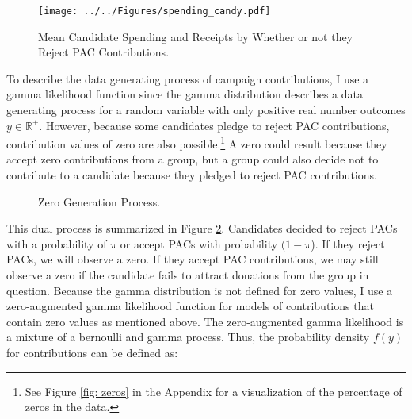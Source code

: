 \documentclass[12pt]{article}
\begin{document}
\begin{figure}[ht]
    \centering
    \texttt{[image: ../../Figures/spending\_candy.pdf]}
    \caption{Mean Candidate Spending and Receipts by Whether or not they Reject PAC Contributions.}
    \label{fig: spending}
\end{figure}

To describe the data generating process of campaign contributions, I use a gamma likelihood function since the gamma distribution describes a data generating process for a random variable with only positive real number outcomes $y \in  \mathbb{R}^+$. However, because some candidates pledge to reject PAC contributions, contribution values of zero are also possible.\footnote{See Figure \ref{fig: zeros} in the Appendix for a visualization of the percentage of zeros in the data.} A zero could result because they accept zero contributions from a group, but a group could also decide not to contribute to a candidate because they pledged to reject PAC contributions. 

\begin{figure}[!htb]
    \centering
    \caption{Zero Generation Process.}
    \label{fig: zero process}
\end{figure}

This dual process is summarized in Figure \ref{fig: zero process}. Candidates decided to reject PACs with a probability of $\pi$ or accept PACs with probability $(1 - \pi$). If they reject PACs, we will observe a zero. If they accept PAC contributions, we may still observe a zero if the candidate fails to attract donations from the group in question. Because the gamma distribution is not defined for zero values, I use a zero-augmented gamma likelihood function for models of contributions that contain zero values as mentioned above. The zero-augmented gamma likelihood is a mixture of a bernoulli and gamma process. Thus, the probability density $f(y)$ for contributions can be defined as:    
\end{document}
